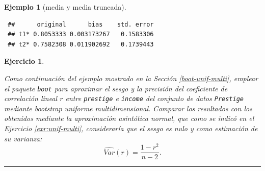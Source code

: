 \documentclass[
]{book}
\newenvironment{Shaded}{\begin{snugshade}}{\end{snugshade}}
\newcommand{\AttributeTok}[1]{\textcolor[rgb]{0.77,0.63,0.00}{#1}}
\newcommand{\ConstantTok}[1]{\textcolor[rgb]{0.00,0.00,0.00}{#1}}
\newcommand{\DecValTok}[1]{\textcolor[rgb]{0.00,0.00,0.81}{#1}}
\newcommand{\FunctionTok}[1]{\textcolor[rgb]{0.00,0.00,0.00}{#1}}
\newcommand{\NormalTok}[1]{#1}
\newcommand{\OtherTok}[1]{\textcolor[rgb]{0.56,0.35,0.01}{#1}}
\newcommand{\SpecialCharTok}[1]{\textcolor[rgb]{0.00,0.00,0.00}{#1}}
\newcommand{\StringTok}[1]{\textcolor[rgb]{0.31,0.60,0.02}{#1}}
\theoremstyle{break}
\newtheorem{exercise}{Ejercicio}[chapter]
\newtheorem{example}{Ejemplo}[chapter]
\theoremstyle{nonumberplain}
\begin{document}
\begin{example}[media y media truncada]
\begin{Shaded}
\end{Shaded}

\begin{verbatim}
 ##      original      bias    std. error
 ## t1* 0.8053333 0.003173267   0.1583306
 ## t2* 0.7582308 0.011902692   0.1739443
\end{verbatim}

\end{example}

\begin{exercise}
\protect\hypertarget{exr:unif-multi-sesgo-var}{}\label{exr:unif-multi-sesgo-var}

Como continuación del ejemplo mostrado en la Sección \ref{boot-unif-multi}, emplear el paquete \texttt{boot} para aproximar el sesgo y la precisión del coeficiente de correlación lineal \(r\) entre \texttt{prestige} e \texttt{income} del conjunto de datos \texttt{Prestige} mediante bootstrap uniforme multidimensional.
Comparar los resultados con los obtenidos mediante la aproximación asintótica normal, que como se indicó en el Ejercicio \ref{exr:unif-multi}, consideraría que el sesgo es nulo y como estimación de su varianza:
\[\widehat{Var}(r) = \frac{1 - r^2}{n - 2}.\]
\end{exercise}

\begin{center}\rule{0.5\linewidth}{0.5pt}\end{center}
\end{document}
